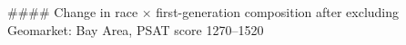 #### Change in race × first-generation composition after excluding Geomarket: Bay Area, PSAT score 1270–1520

